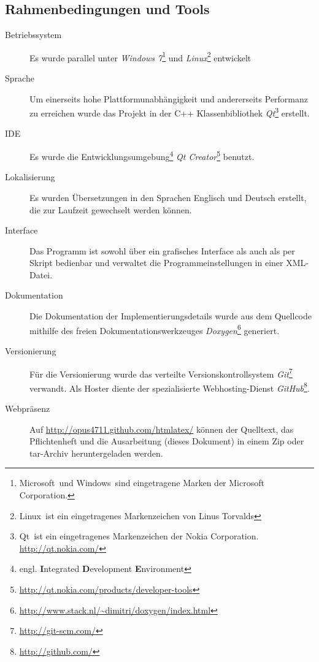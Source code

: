 \documentclass[	a4paper,		%
		titlepage, 		%
		fontsize=12pt		%
		]{scrartcl} 		%
\begin{document}
\subsection{Rahmenbedingungen und Tools}
\begin{description}
 \item[Betriebssystem]
 Es wurde parallel unter \emph{Windows 7}\footnote{Microsoft\textregistered ~und Windows\textregistered ~sind eingetragene Marken der Microsoft Corporation.} und \emph{Linux}\footnote{Linux\textregistered ~ist ein eingetragenes Markenzeichen von Linus Torvalds} entwickelt

 \item[Sprache]
Um einerseits hohe Plattformunabhängigkeit und andererseits Performanz zu erreichen wurde das Projekt in der C++ Klassenbibliothek \emph{Qt}\footnote{Qt\textregistered ~ist ein eingetragenes Markenzeichen der Nokia Corporation. \href{http://qt.nokia.com/}{http://qt.nokia.com/}} erstellt.

 \item[IDE]
Es wurde die Entwicklungsumgebung\footnote{engl. \textbf{I}ntegrated \textbf{D}evelopment \textbf{E}nvironment} \emph{Qt Creator}\footnote{\href{http://qt.nokia.com/products/developer-tools}{http://qt.nokia.com/products/developer-tools}} benutzt.

 \item[Lokalisierung]
Es wurden Übersetzungen in den Sprachen Englisch und Deutsch erstellt, die zur Laufzeit gewechselt werden können.

 \item[Interface]
Das Programm ist sowohl über ein grafisches Interface als auch als per Skript bedienbar und verwaltet die Programmeinstellungen in einer XML-Datei.

 \item[Dokumentation]
Die Dokumentation der Implementierungsdetails wurde aus dem Quellcode mithilfe des freien Dokumentationswerkzeuges \emph{Doxygen}\footnote{\href{http://www.stack.nl/~dimitri/doxygen/index.html}{http://www.stack.nl/\textasciitilde dimitri/doxygen/index.html}} generiert.

 \item[Versionierung]
Für die Versionierung wurde das verteilte Versionskontrollsystem \emph{Git}\footnote{\href{http://git-scm.com/}{http://git-scm.com/}} verwandt. Als Hoster diente der spezialisierte Webhosting-Dienst \emph{GitHub}\footnote{\href{http://github.com/}{http://github.com/}}.

 \item[Webpräsenz]
Auf \href{http://opus4711.github.com/htmlatex/}{http://opus4711.github.com/htmlatex/} können der Quelltext, das Pflichtenheft und die Ausarbeitung (dieses Dokument) in einem Zip oder tar-Archiv heruntergeladen werden.


\end{description}
\end{document}
